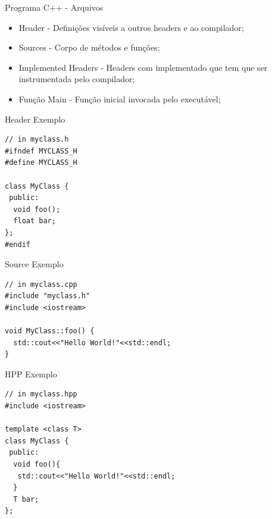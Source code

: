 \documentclass[12pt,table,xcolor={dvipsnames}]{beamer}
\begin{document}
\begin{frame}{Programa C++ - Arquivos}
\begin{itemize}
\item Header - Definições visíveis a outros headers e ao compilador;
\item Sources - Corpo de métodos e funções;
\item Implemented Headers - Headers com implementado que tem que ser instrumentada pelo compilador;
\item Função Main - Função inicial invocada pelo executável;
\end{itemize}
\end{frame}

\begin{frame}[fragile]{Header Exemplo}
\begin{lstlisting}
// in myclass.h
#ifndef MYCLASS_H
#define MYCLASS_H

class MyClass {
 public:
  void foo();
  float bar;
};
#endif
\end{lstlisting}
\end{frame}

\begin{frame}[fragile]{Source Exemplo}
\begin{lstlisting}
// in myclass.cpp
#include "myclass.h"
#include <iostream>

void MyClass::foo() {
  std::cout<<"Hello World!"<<std::endl;
}
\end{lstlisting}
\end{frame}


\begin{frame}[fragile]{HPP Exemplo}
\begin{lstlisting}
// in myclass.hpp
#include <iostream>

template <class T>
class MyClass {
 public:
  void foo(){
   std::cout<<"Hello World!"<<std::endl;
  }
  T bar;
};
\end{lstlisting}
\end{frame}
\end{document}
